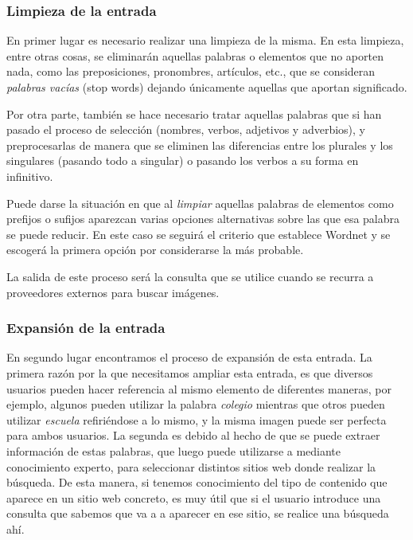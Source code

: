 \subsubsection{Limpieza de la entrada}


En primer lugar es necesario realizar una limpieza de la misma. En esta limpieza, entre otras cosas, se eliminarán aquellas palabras o elementos que no aporten nada, como las preposiciones, pronombres, artículos, etc., que se consideran \textit{palabras vacías} (stop words) dejando únicamente aquellas que aportan significado. 

Por otra parte, también se hace necesario tratar aquellas palabras que si han pasado el proceso de selección (nombres, verbos, adjetivos y adverbios), y preprocesarlas de manera que se eliminen las diferencias entre los plurales y los singulares (pasando todo a singular) o pasando los verbos a su forma en infinitivo.

Puede darse la situación en que al \textit{limpiar} aquellas palabras de elementos como prefijos o sufijos aparezcan varias opciones alternativas sobre las que esa palabra se puede reducir. En este caso se seguirá el criterio que establece Wordnet y se escogerá la primera opción por considerarse la más probable.

La salida de este proceso será la consulta que se utilice cuando se recurra a proveedores externos para buscar imágenes.\\


\subsubsection{Expansión de la entrada}


En segundo lugar encontramos el proceso de expansión de esta entrada. La primera razón por la que necesitamos ampliar esta entrada, es que diversos usuarios pueden hacer referencia al mismo elemento de diferentes maneras, por ejemplo, algunos pueden utilizar la palabra \textit{colegio} mientras que otros pueden utilizar \textit{escuela} refiriéndose a lo mismo, y la misma imagen puede ser perfecta para ambos usuarios. La segunda es debido al hecho de que se puede extraer información de estas palabras, que luego puede utilizarse a mediante conocimiento experto, para seleccionar distintos sitios web donde realizar la búsqueda. De esta manera, si tenemos conocimiento del tipo de contenido que aparece en un sitio web concreto, es muy útil que si el usuario introduce una consulta que sabemos que va a a aparecer en ese sitio, se realice una búsqueda ahí.

